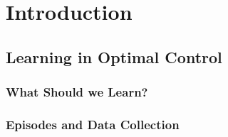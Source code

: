\chapter{Introduction}


\section{Learning in Optimal Control}


\subsection{What Should we Learn?}

\subsection{Episodes and Data Collection}




